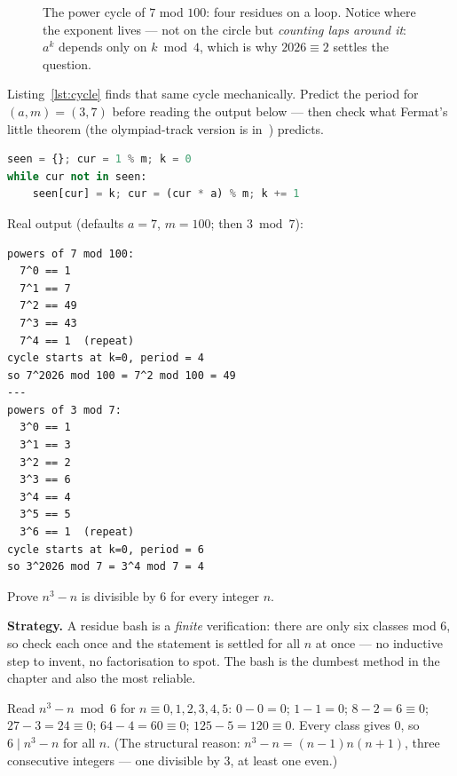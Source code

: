 \begin{figure}[ht]\centering

\caption{The power cycle of $7$ mod $100$: four residues on a loop. Notice
where the exponent lives --- not on the circle but \emph{counting laps
around it}: $a^k$ depends only on $k \bmod 4$, which is why $2026 \equiv 2$
settles the question.}
\label{fig:cycle}
\end{figure}

\begin{checkpoint}
Listing~\ref{lst:cycle} finds that same cycle mechanically. Predict the
period for $(a,m) = (3,7)$ before reading the output below --- then check
what Fermat's little theorem (the olympiad-track version is in~\cite{zhao}) predicts.
\end{checkpoint}

\begin{lstlisting}[language=Python,caption={\texttt{powers\_cycle.py}:
multiply until a residue repeats (full script in
\texttt{code/powers\_cycle.py}).},label={lst:cycle}]
seen = {}; cur = 1 % m; k = 0
while cur not in seen:
    seen[cur] = k; cur = (cur * a) % m; k += 1
\end{lstlisting}
Real output (defaults $a=7$, $m=100$; then $3 \bmod 7$):
\begin{lstlisting}[numbers=none]
powers of 7 mod 100:
  7^0 == 1
  7^1 == 7
  7^2 == 49
  7^3 == 43
  7^4 == 1  (repeat)
cycle starts at k=0, period = 4
so 7^2026 mod 100 = 7^2 mod 100 = 49
---
powers of 3 mod 7:
  3^0 == 1
  3^1 == 3
  3^2 == 2
  3^3 == 6
  3^4 == 4
  3^5 == 5
  3^6 == 1  (repeat)
cycle starts at k=0, period = 6
so 3^2026 mod 7 = 3^4 mod 7 = 4
\end{lstlisting}

\begin{example}\label{ex:n3n}
Prove $n^3 - n$ is divisible by $6$ for every integer $n$.
\par\smallskip
\textbf{Strategy.} A residue bash is a \emph{finite} verification: there
are only six classes mod $6$, so check each once and the statement is
settled for all $n$ at once --- no inductive step to invent, no
factorisation to spot. The bash is the dumbest method in the chapter and
also the most reliable.
\par\smallskip
\begin{solution}
Read $n^3 - n \bmod 6$ for $n \equiv 0,1,2,3,4,5$:
$0 - 0 = 0$; $1 - 1 = 0$; $8 - 2 = 6 \equiv 0$; $27 - 3 = 24 \equiv 0$;
$64 - 4 = 60 \equiv 0$; $125 - 5 = 120 \equiv 0$.
Every class gives $0$, so $6 \mid n^3 - n$ for all $n$. (The structural
reason: $n^3 - n = (n-1)n(n+1)$, three consecutive integers --- one
divisible by $3$, at least one even.)
\end{solution}
\end{example}

